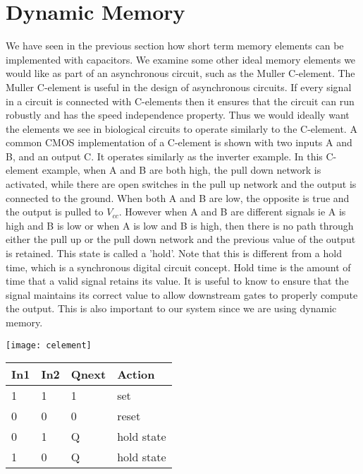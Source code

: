 \documentclass{article}
\begin{document}
\section{Dynamic Memory}
We have seen in the previous section how short term memory elements can be implemented with capacitors.  We examine some other ideal memory elements we would like as part of an asynchronous circuit, such as the Muller C-element. 
The Muller C-element is useful in the design of asynchronous circuits.  If every signal in a circuit is connected with C-elements then it ensures that the circuit can run robustly and has the speed independence property.  Thus we would ideally want the elements we see in biological circuits to operate similarly to the C-element.  A common CMOS implementation of a C-element is shown with two inputs A and B, and an output C.  It operates similarly as the inverter example.  In this C-element example, when A and B are both high, the pull down network is activated, while there are open switches in the pull up network and the output is connected to the ground.  When both A and B are low, the opposite is true and the output is pulled to $V_{cc}$.  However when A and B are different signals ie A is high and B is low or when A is low and B is high, then there is no path through either the pull up or the pull down network and the previous value of the output is retained.  This state is called a 'hold'.  Note that this is different from a hold time, which is a synchronous digital circuit concept.  Hold time is the amount of time that a valid signal retains its value.  It is useful to know to ensure that the signal maintains its correct value to allow downstream gates to properly compute the output. This is also important to our system since we are using dynamic memory.
\begin{center}
\texttt{[image: celement]}
\end{center}
\begin{center}

\begin{tabular}{|p{1.5cm}|p{1.5cm}|p{1.5cm}|p{2cm}| } 
 \hline
\textbf{In1} & \textbf{In2} & \textbf{Qnext} & \textbf{Action} \\
\hline
1 & 1 & 1 & set \\
\hline
0 & 0 & 0 & reset \\ 
\hline
0 & 1 & Q & hold state \\ 
\hline
1 & 0 & Q & hold state\\ 
\hline
\end{tabular}

\end{center}
\end{document}
